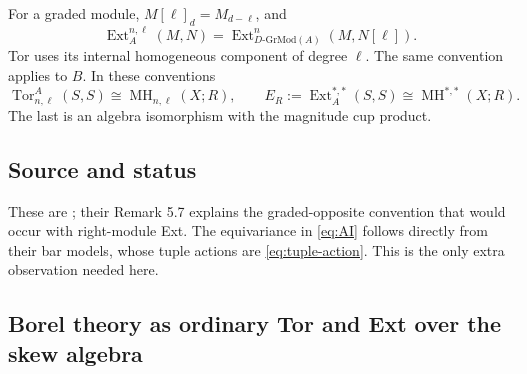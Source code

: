 \documentclass[11pt,a4paper]{article}
\numberwithin{equation}{section}
\theoremstyle{definition}
\theoremstyle{remark}
\newcommand{\MH}{\operatorname{MH}}
\newcommand{\Tor}{\operatorname{Tor}}
\newcommand{\Ext}{\operatorname{Ext}}
\newcommand{\source}{\subsection*{\color{darkblue}Source and status}}
\begin{document}
For a graded module, $M[\ell]_d=M_{d-\ell}$, and
\[
 \Ext_A^{n,\ell}(M,N)
 =\Ext^n_{D\text{-}\mathrm{GrMod}(A)}(M,N[\ell]).
\]
Tor uses its internal homogeneous component of degree $\ell$.
The same convention applies to $B$.  In these conventions
\begin{equation}\label{eq:AI}
 \Tor^A_{n,\ell}(S,S)\cong\MH_{n,\ell}(X;R),\qquad
 E_R:=\Ext_A^{*,*}(S,S)\cong\MH^{*,*}(X;R).
\end{equation}
The last is an algebra isomorphism with the magnitude cup product.
\source These are \cite[Theorems 5.3 and 5.6]{AI}; their
Remark 5.7 explains the graded-opposite convention that would occur
with right-module Ext.  The equivariance in \eqref{eq:AI} follows
directly from their bar models, whose tuple actions are
\eqref{eq:tuple-action}.  This is the only extra observation needed
here.

\subsection{Borel theory as ordinary Tor and Ext over the skew algebra}
\end{document}
